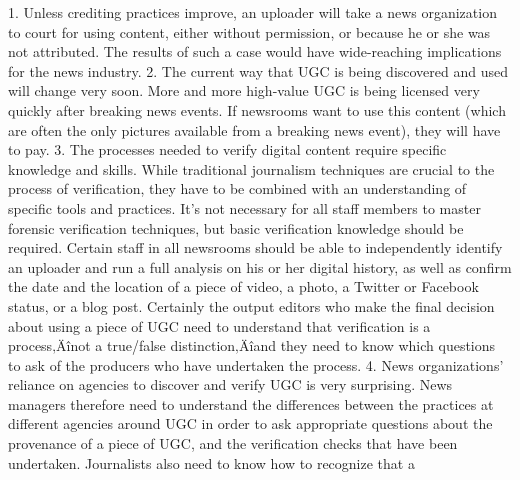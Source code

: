 \documentclass[symmetric, notoc, nobib]{towcenter-book}
\begin{document}
1. Unless crediting practices improve, an uploader will take a news
organization to court for using content, either without permission,
or because he or she was not attributed. The results of such a case
would have wide-reaching implications for the news industry.
2. The current way that UGC is being discovered and used will change
very soon. More and more high-value UGC is being licensed very
quickly after breaking news events. If newsrooms want to use this
content (which are often the only pictures available from a breaking
news event), they will have to pay.
3. The processes needed to verify digital content require specific
knowledge and skills. While traditional journalism techniques are
crucial to the process of verification, they have to be combined with
an understanding of specific tools and practices. It's not necessary
for all staff members to master forensic verification techniques, but
basic verification knowledge should be required. Certain staff in all
newsrooms should be able to independently identify an uploader and
run a full analysis on his or her digital history, as well as confirm
the date and the location of a piece of video, a photo, a Twitter or
Facebook status, or a blog post. Certainly the output editors who
make the final decision about using a piece of UGC need to understand
that verification is a process‚Äînot a true/false distinction‚Äîand
they need to know which questions to ask of the producers who have
undertaken the process.
4. News organizations' reliance on agencies to discover and verify
UGC is very surprising. News managers therefore need to understand
the differences between the practices at different agencies
around UGC in order to ask appropriate questions about the provenance
of a piece of UGC, and the verification checks that have been
undertaken. Journalists also need to know how to recognize that a
\end{document}
